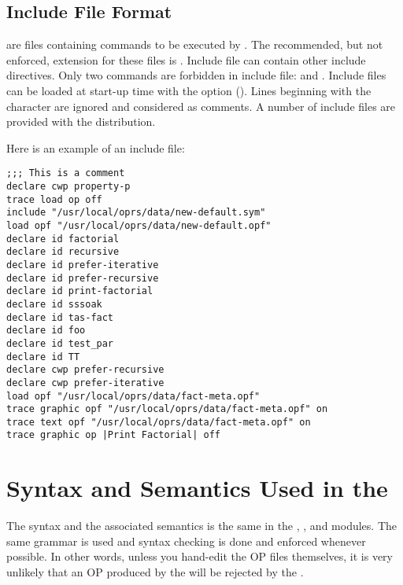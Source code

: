 \section{Include File Format}

 are files containing commands to be executed by \aCPK{}. The
recommended, but not enforced, extension for these files is .
Include file can contain other include directives. Only two commands are
forbidden in include file:  and . Include files
can be loaded at start-up time with the  option (). Lines beginning with the \samp{;} character are ignored and
considered as comments. A number of include files are provided with the
\COPRSDE{} distribution. 

Here is an example of an include file:

\begin{verbatim}
;;; This is a comment
declare cwp property-p
trace load op off
include "/usr/local/oprs/data/new-default.sym"
load opf "/usr/local/oprs/data/new-default.opf"
declare id factorial
declare id recursive
declare id prefer-iterative
declare id prefer-recursive
declare id print-factorial
declare id sssoak
declare id tas-fact
declare id foo
declare id test_par
declare id TT
declare cwp prefer-recursive
declare cwp prefer-iterative
load opf "/usr/local/oprs/data/fact-meta.opf"
trace graphic opf "/usr/local/oprs/data/fact-meta.opf" on
trace text opf "/usr/local/oprs/data/fact-meta.opf" on
trace graphic op |Print Factorial| off
\end{verbatim}

\chapter[Syntax and Semantics\ldots]{Syntax and Semantics Used in the \COPRSDE{}}

The syntax and the associated semantics is the same in the
\CPK{}, \XPK{}, \OPE{} and \OPRSS{} modules. The same grammar is used and syntax
checking is done and enforced whenever possible. In other words, unless you hand-edit
the OP files themselves, it is very unlikely that an OP produced by the
\OPE{} will be rejected by the \CPK{}.

